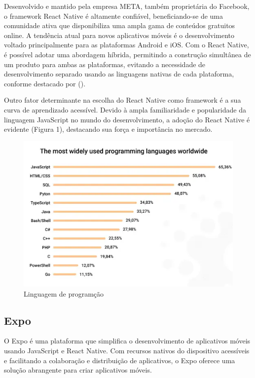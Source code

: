 Desenvolvido e mantido pela empresa META, também proprietária do Facebook, o framework React Native é altamente confiável, beneficiando-se de uma comunidade ativa 
que disponibiliza uma ampla gama de conteúdos gratuitos online. A tendência atual para novos aplicativos móveis é o desenvolvimento voltado principalmente para as 
plataformas Android e iOS. Com o React Native, é possível adotar uma abordagem híbrida, permitindo a construção simultânea de um produto para ambas as plataformas, 
evitando a necessidade de desenvolvimento separado usando as linguagens nativas de cada plataforma, conforme destacado por (\textcite{Sabino}).

Outro fator determinante na escolha do React Native como framework é a sua curva de aprendizado acessível. Devido à ampla familiaridade e popularidade da linguagem 
JavaScript no mundo do desenvolvimento, a adoção do React Native é evidente (Figura 1), destacando sua força e importância no mercado.
\begin{figure}[htb]
	\caption{\label{fig:Fig_1}Linguagem de programção}
	\begin{center}
		\includegraphics{images/top.png}
	\end{center}
\end{figure}

\subsection{Expo}
O Expo é uma plataforma que simplifica o desenvolvimento de aplicativos móveis usando JavaScript e React Native. Com recursos nativos do dispositivo acessíveis e facilitando a colaboração e distribuição de aplicativos, o Expo oferece uma solução abrangente para criar aplicativos móveis.


